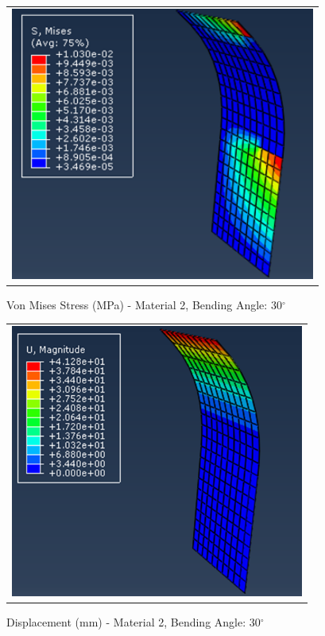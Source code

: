 \documentclass[a4paper,12pt]{article}
\numberwithin{equation}{section}
\numberwithin{figure}{section}
\begin{document}
\begin{figure}[H]
  \centering
  \begin{tabular}{@{}c@{}}
    \includegraphics[width=0.7\linewidth,height=255pt]{Results/Bending/M2_VMS_30.png} \\
  \end{tabular}
  \caption{Von Mises Stress (MPa) - Material 2,  Bending Angle: 30$^{\circ}$ }
\end{figure}

\begin{figure}[H]
  \centering
  \begin{tabular}{@{}c@{}}
    \includegraphics[width=0.7\linewidth,height=255pt]{Results/Bending/M2_DIS_30.png} \\
  \end{tabular}
  \caption{Displacement (mm) - Material 2, Bending Angle: 30$^{\circ}$ }
\end{figure}
\end{document}
